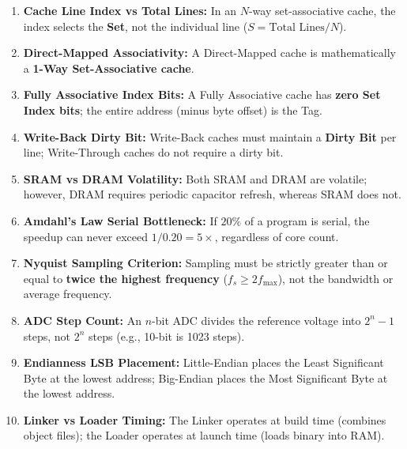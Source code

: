\begin{enumerate}[label=\bfseries\arabic*.]
    \item \textbf{Cache Line Index vs Total Lines:} In an $N$-way set-associative cache, the index selects the \textbf{Set}, not the individual line ($S = \text{Total Lines} / N$).
    \item \textbf{Direct-Mapped Associativity:} A Direct-Mapped cache is mathematically a \textbf{1-Way Set-Associative cache}.
    \item \textbf{Fully Associative Index Bits:} A Fully Associative cache has \textbf{zero Set Index bits}; the entire address (minus byte offset) is the Tag.
    \item \textbf{Write-Back Dirty Bit:} Write-Back caches must maintain a \textbf{Dirty Bit} per line; Write-Through caches do not require a dirty bit.
    \item \textbf{SRAM vs DRAM Volatility:} Both SRAM and DRAM are volatile; however, DRAM requires periodic capacitor refresh, whereas SRAM does not.
    \item \textbf{Amdahl's Law Serial Bottleneck:} If $20\%$ of a program is serial, the speedup can never exceed $1/0.20 = 5\times$, regardless of core count.
    \item \textbf{Nyquist Sampling Criterion:} Sampling must be strictly greater than or equal to \textbf{twice the highest frequency} ($f_s \ge 2 f_{\text{max}}$), not the bandwidth or average frequency.
    \item \textbf{ADC Step Count:} An $n$-bit ADC divides the reference voltage into $2^n - 1$ steps, not $2^n$ steps (e.g., 10-bit is 1023 steps).
    \item \textbf{Endianness LSB Placement:} Little-Endian places the Least Significant Byte at the lowest address; Big-Endian places the Most Significant Byte at the lowest address.
    \item \textbf{Linker vs Loader Timing:} The Linker operates at build time (combines object files); the Loader operates at launch time (loads binary into RAM).
\end{enumerate}
